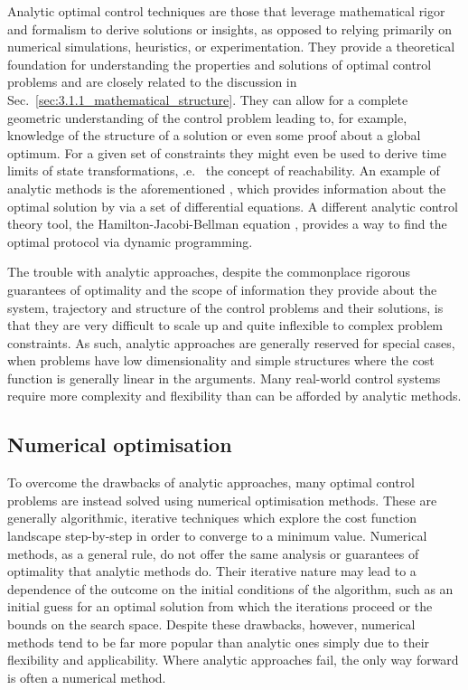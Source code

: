 Analytic optimal control techniques are those that leverage mathematical rigor and formalism to derive solutions or insights, as opposed to relying primarily on numerical simulations, heuristics, or experimentation. They provide a theoretical foundation for understanding the properties and solutions of optimal control problems and are closely related to the discussion in Sec.~\ref{sec:3.1.1_mathematical_structure}. They can allow for a complete geometric understanding of the control problem leading to, for example, knowledge of the structure of a solution or even some proof about a global optimum. For a given set of constraints they might even be used to derive time limits of state transformations, \@i.e.~ the concept of reachability. An example of analytic methods is the aforementioned , which provides information about the optimal solution by via a set of differential equations. A different analytic control theory tool, the Hamilton-Jacobi-Bellman equation \cite{yong_dynamic_1999}, provides a way to find the optimal protocol via dynamic programming\cite{sniedovich_dynamic_2010}.

The trouble with analytic approaches, despite the commonplace rigorous guarantees of optimality and the scope of information they provide about the system, trajectory and structure of the control problems and their solutions, is that they are very difficult to scale up and quite inflexible to complex problem constraints. As such, analytic approaches are generally reserved for special cases, when problems have low dimensionality and simple structures where the cost function is generally linear in the arguments. Many real-world control systems require more complexity and flexibility than can be afforded by analytic methods.

\subsection{Numerical optimisation}\label{sec:3.1.3_numerical_optimisation}

To overcome the drawbacks of analytic approaches, many optimal control problems are instead solved using numerical optimisation methods. These are generally algorithmic, iterative  techniques which explore the cost function landscape step-by-step in order to converge to a minimum value. Numerical methods, as a general rule, do not offer the same analysis or guarantees of optimality that analytic methods do. Their iterative nature may lead to a dependence of the outcome on the initial conditions of the algorithm, such as an initial guess for an optimal solution from which the iterations proceed or the bounds on the search space. Despite these drawbacks, however, numerical methods tend to be far more popular than analytic ones simply due to their flexibility and applicability. Where analytic approaches fail, the only way forward is often a numerical method.

